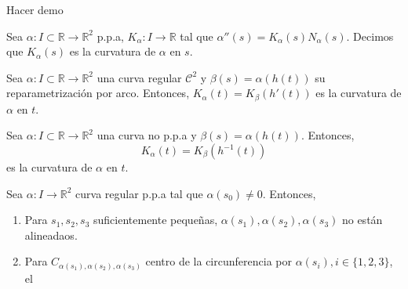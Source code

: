 \begin{dem}
  Hacer demo
\end{dem}

\begin{defn}[Curvatura]
  Sea $\alpha  : I \subset \mathbb{R} \to \mathbb{R}^{2}$ p.p.a, $K_{\alpha}: I \to \mathbb{R}$ tal que $\alpha''(s) = K_{\alpha}(s) N_{\alpha}(s)$. Decimos que $K_{\alpha}(s)$ es la curvatura de $\alpha$ en $s$.
\end{defn}

\begin{defn}
  Sea $\alpha  : I \subset \mathbb{R} \to \mathbb{R}^{2}$ una curva regular $\mathcal{C}^{2}$ y $\beta(s)= \alpha(h(t))$ su reparametrización por arco. Entonces, $K_{\alpha}(t) = K_{\beta}(h'(t))$ es la curvatura de $\alpha$ en $t$.
\end{defn}

\begin{defn}
  Sea $\alpha  : I \subset \mathbb{R} \to \mathbb{R}^{2}$ una curva no p.p.a y $\beta(s) = \alpha(h(t))$. Entonces,
  \[
    K_{\alpha}(t) = K_{\beta}(h^{-1}(t))
  \] 
  es la curvatura de $ \alpha$ en $t$.
\end{defn}

\begin{theo}
  Sea $\alpha: I \to \mathbb{R}^{2}$ curva regular p.p.a tal que $\alpha(s_{0}) \neq 0$. Entonces, 
  \begin{enumerate}[label=(\roman*)]
    \item Para $s_{1},s_{2},s_{3}$ suficientemente pequeñas, $\alpha(s_{1}), \alpha(s_{2}),\alpha(s_{3})$ no están alineadaos.
    \item Para $C_{\alpha(s_{1}), \alpha(s_{2}), \alpha(s_{3})}$ centro de la circunferencia por $\alpha(s_{i}), i \in \{ 1, 2, 3 \}$, el 
  \end{enumerate}
\end{theo}

